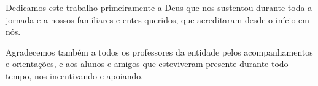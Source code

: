 \begin{dedicatoria}[DEDICATÓRIA]
Dedicamos este trabalho primeiramente a Deus que nos sustentou durante toda a jornada e a nossos familiares e entes queridos, que acreditaram desde o início em nós.

Agradecemos também a todos os professores da entidade pelos acompanhamentos e orientações, e aos alunos e amigos que esteviveram presente durante todo tempo, nos incentivando e apoiando.
\end{dedicatoria}